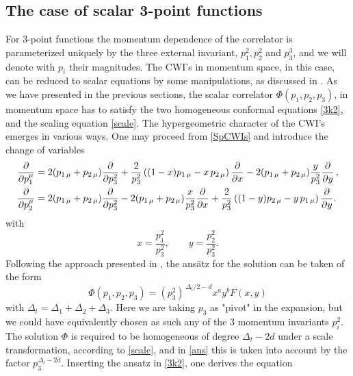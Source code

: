 \documentclass[a4paper,11pt,openright,twoside]{book}
\numberwithin{equation}{section}
\begin{document}
\subsection{The case of scalar 3-point functions}
\label{fuchs2}
For 3-point functions the momentum dependence of the correlator is parameterized uniquely by the three external invariant, $p_1^2, p_2^2$ and $p_3^3$, and we will denote with $p_i$ their magnitudes. The CWI's in momentum space, in this case, can be reduced to scalar equations by some manipulations, as discussed in \cite{Coriano:2013jba,Bzowski:2013sza,Coriano:2018bbe}.  
As we have presented in the previous sections, the scalar correlator 
$\Phi(p_1,p_2, p_3)$, in momentum space has to satisfy the two homogeneous conformal equations \eqref{3k2}, and the scaling equation \eqref{scale}. The hypergeometric character of the CWI's emerges in various ways. One may proceed from \eqref{SpCWIs} and introduce the change of variables
\begin{eqnarray}
	\frac{\partial}{\partial p_{1}^{\mu}}  &=   2 (p_{1\, \mu} + p_{2 \, \mu}) \frac{\partial}{\partial p_3^2} + \frac{2}{p_3^2}\left( 
	(1- x) p_{1 \, \mu}  - x  \,  p_{2 \, \mu} \right) \frac{\partial}{\partial x} - 2  (p_{1\, \mu} + p_{2 \, \mu}) \frac{y}{p_3^2} 
	\frac{\partial}{\partial y} \,, \notag \\
	\frac{\partial}{\partial p_{2}^{\mu}}  &= 2 (p_{1\, \mu} + p_{2 \, \mu}) \frac{\partial}{\partial p_3^2}   -   2  (p_{1\, \mu} + 
	p_{2 \, \mu}) \frac{x}{p_3^2} \frac{\partial}{\partial x}   + \frac{2}{p_3^2}\left( (1- y) p_{2 \, \mu}  - y  \,  p_{1 \, \mu} 
	\right) \frac{\partial}{\partial y}. \, 
\end{eqnarray}
%
with
\begin{equation}
	x=\frac{p_1^2}{p_3^2},\qquad y=\frac{p_2^2}{p_3^2}.\label{xy}
\end{equation}
Following the approach presented in \cite{Coriano:2013jba}, the ans\"atz for the solution can be taken of the form 
\begin{equation}
	\label{ans}
	\Phi(p_1,p_2,p_3)=(p_3^2)^{\,\Delta_t/2 -  d} x^{a}y^{b} F(x,y)
\end{equation}
with $\Delta_t=\Delta_1+\Delta_2+\Delta_3$. Here we are taking $p_3$ as "pivot" in the expansion, but we could have equivalently chosen as such any of the 3  momentum invariants $p_i^2$. \\
The solution $\Phi$ is required to be homogeneous of degree $\Delta_t-2 d$ under a scale transformation, according to \eqref{scale}, and in \eqref{ans} this is taken into account by the factor $p_3^{\Delta_t - 2 d}$. Inserting the ansatz in \eqref{3k2}, one derives the equation 
\end{document}
